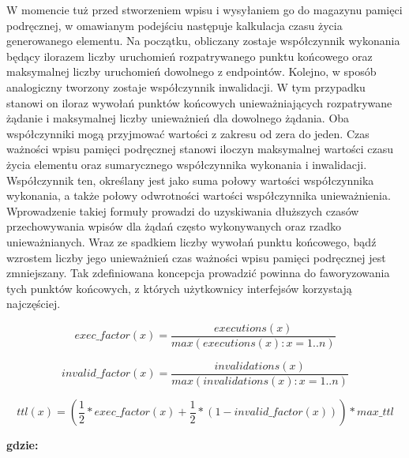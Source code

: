 W momencie tuż przed stworzeniem wpisu i wysyłaniem go do magazynu pamięci podręcznej, w omawianym podejściu następuje kalkulacja czasu życia generowanego elementu. Na początku, obliczany zostaje współczynnik wykonania będący ilorazem liczby uruchomień rozpatrywanego punktu końcowego oraz maksymalnej liczby uruchomień dowolnego z endpointów. Kolejno, w sposób analogiczny tworzony zostaje współczynnik inwalidacji. W tym przypadku stanowi on iloraz wywołań punktów końcowych unieważniających rozpatrywane żądanie i maksymalnej liczby unieważnień dla dowolnego żądania. Oba współczynniki mogą przyjmować wartości z zakresu od zera do jeden. Czas ważności wpisu pamięci podręcznej stanowi iloczyn maksymalnej wartości czasu życia elementu oraz sumarycznego współczynnika wykonania i inwalidacji. Współczynnik ten, określany jest jako suma połowy wartości współczynnika wykonania, a także połowy odwrotności wartości współczynnika unieważnienia. Wprowadzenie takiej formuły prowadzi do uzyskiwania dłuższych czasów przechowywania wpisów dla żądań często wykonywanych oraz rzadko unieważnianych. Wraz ze spadkiem liczby wywołań punktu końcowego, bądź wzrostem liczby jego unieważnień czas ważności wpisu pamięci podręcznej jest zmniejszany. Tak zdefiniowana koncepcja prowadzić powinna do faworyzowania tych punktów końcowych, z których użytkownicy interfejsów korzystają najczęściej.

\begin{equation}
    exec\_factor(x) =  \frac{executions(x)}{max(executions(x):x=1..n)}
    \label{eq:execution-factor}
\end{equation}

\begin{equation}
    invalid\_factor(x) =  \frac{invalidations(x)}{max(invalidations(x):x=1..n)}
    \label{eq:invalidation-factor}
\end{equation}

\begin{equation}
    ttl(x) = (\frac{1}{2} * exec\_factor(x) + \frac{1}{2} * (1 - invalid\_factor(x))) * max\_ttl
    \label{eq:time-to-live}
\end{equation}



\noindent \textbf{gdzie:}

